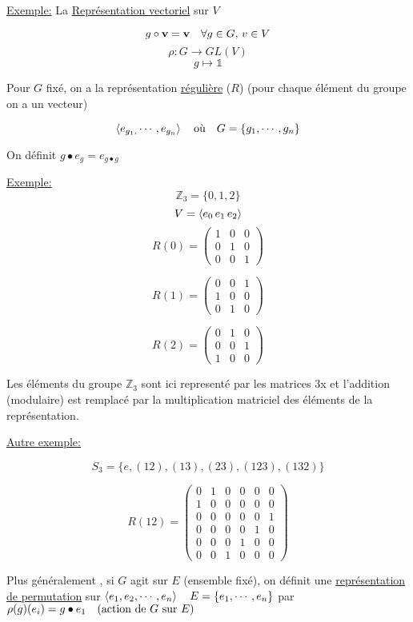 \underline{Exemple:} La \underline{Représentation vectoriel} sur $V$  

\[ g \circ \vb{v} = \vb{v} \quad \forall g \in G,\, v\in V \]
\[ \rho: G \to GL(V) \]
\[ g\mapsto \mathds{1} \]


Pour $G$ fixé, on a la représentation \underline{régulière} ($R$) (pour chaque élément du groupe on a un vecteur) 

\[ \expval{e_{g_{1},}  \dotsb, e_{g_n} }  \qq{où} G = \{ g_1, \dotsb, g_n  \} \]

On définit $g \bullet e_g = e_{g \bullet g}$

\underline{Exemple:} \[ \mathds{Z}_3 = \{ 0,1,2 \}  \] 
\[ V = \expval{e_0 \, e_1 \, e_2 } \]
\[ R(0) = \begin{pmatrix} 1 & 0  &0 \\ 0 & 1 & 0 \\ 0 & 0 &1 \end{pmatrix}  \]

\[ R(1) = \begin{pmatrix} 0 & 0  &1 \\ 1 & 0 & 0 \\ 0 & 1 &0 \end{pmatrix}  \]


\[ R(2) = \begin{pmatrix} 0 & 1  &0 \\ 0 & 0 & 1 \\ 1 & 0 &0 \end{pmatrix}  \]

Les éléments du groupe $\mathds{Z}_3$ sont ici representé par les matrices 3x et l'addition (modulaire) est remplacé par la multiplication matriciel des éléments de la représentation.

\underline{Autre exemple:} 

\[ S_3 = \{ e, (12), (13), (23), (123), (132) \}  \]

\[ R(12)  = \begin{pmatrix} 0 & 1 & 0 & 0 &0 &0 \\ 1 & 0&0 &0&0 &0\\ 0 &0 &0 &0 &0 & 1\\ 0&0&0&0&1&0 \\ 0&0&0&1&0&0 \\ 0&0&1&0&0&0 \end{pmatrix} \]

Plus généralement , si $G$ agit sur $E$ (ensemble fixé), on définit une \underline{représentation de permutation} sur $\expval{e_1 , e_2 , \dotsb , e_{n}} \quad E = \{ e_1 , \dotsb , e_n \} $ par $\rho(g)(e_i ) = g \bullet e_1 \qq{(action de $G$ sur $E$)}$

